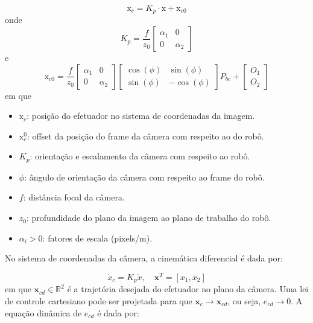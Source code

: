 \documentclass[10pt]{article}
\begin{document}
\begin{equation}
\text{x}_c = K_p \cdot \text{x} + \text{x}_{c0}
\end{equation}
onde
\begin{equation}
K_p = \frac{f}{z_0} \begin{bmatrix}
\alpha_1 & 0 \\
0 & \alpha_2
\end{bmatrix}
\end{equation}
e
\begin{equation}
\text{x}_{c0} = \frac{f}{z_0} \begin{bmatrix}
\alpha_1 & 0 \\
0 & \alpha_2
\end{bmatrix}
\begin{bmatrix}
    \cos(\phi) & \sin(\phi) \\
    \sin(\phi) & -\cos(\phi)
\end{bmatrix} P_{bc}
+ \begin{bmatrix}
    O_1 \\
    O_2
\end{bmatrix}
\end{equation}
em que
\begin{itemize}
    \item $\text{x}_c$: posição do efetuador no sistema de coordenadas da imagem.
    \item $\text{x}_c^0$: offset da posição do frame da câmera com respeito ao do robô.
    \item $K_p$: orientação e escalamento da câmera com respeito ao robô.
    \item $\phi$: ângulo de orientação da câmera com respeito ao frame do robô.
    \item $f$: distância focal da câmera.
    \item $z_0$: profundidade do plano da imagem ao plano de trabalho do robô.
    \item $\alpha_i > 0$: fatores de escala (pixels/m).
\end{itemize}

No sistema de coordenadas da câmera, a cinemática diferencial é dada por:

\begin{equation}
\dot{x}_c = K_p \dot{x}, \quad \mathbf{x}^T = [x_1, x_2]
\end{equation}
em que \( \mathbf{x}_{cd} \in \mathbb{R}^2 \) é a trajetória desejada do efetuador no plano da câmera. Uma lei de controle cartesiano pode ser projetada para que \( \mathbf{x}_c \to \mathbf{x}_{cd} \), ou seja, \( e_{cd} \to 0 \).
A equação dinâmica de \( e_{cd} \) é dada por:
\end{document}
